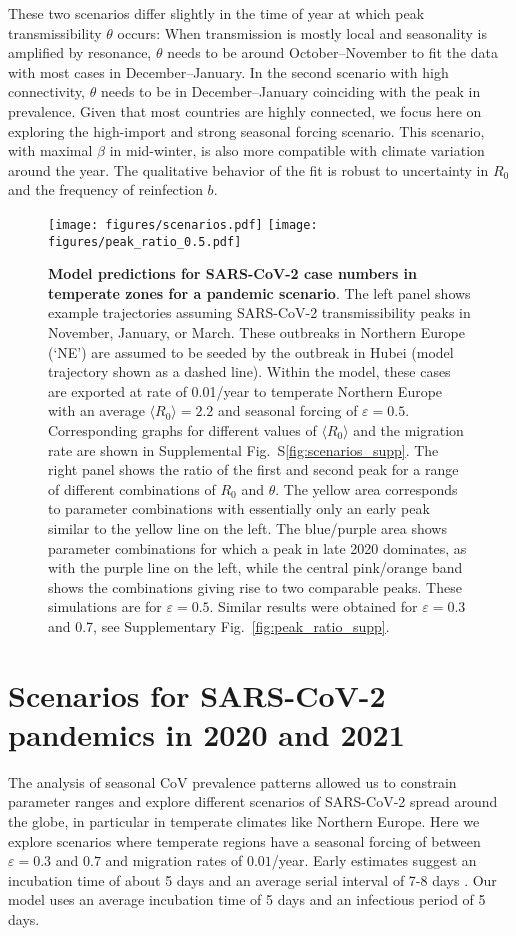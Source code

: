 \documentclass[rmp, reprint, superscriptaddress, floatfix,amsmath]{revtex4-1}
\newcommand{\forcing}{\varepsilon}
\begin{document}
These two scenarios differ slightly in the time of year at which peak transmissibility $\theta$ occurs: 
When transmission is mostly local and seasonality is amplified by resonance, $\theta$ needs to be around October--November to fit the data with most cases in December--January. 
In the second scenario with high connectivity, $\theta$ needs to be in December--January coinciding with the peak in prevalence.
Given that most countries are highly connected, we focus here on exploring the high-import and strong seasonal forcing scenario.
This scenario, with maximal $\beta$ in mid-winter, is also more compatible with climate variation around the year.
The qualitative behavior of the fit is robust to uncertainty in $R_0$ and the frequency of reinfection $b$.


\begin{figure*}
    \centering
    \texttt{[image: figures/scenarios.pdf]}
    \texttt{[image: figures/peak\_ratio\_0.5.pdf]}
\caption{{\bf Model predictions for SARS-CoV-2 case numbers in temperate zones for a pandemic scenario}. The left panel shows example trajectories assuming SARS-CoV-2 transmissibility peaks in November, January, or March. 
These outbreaks in Northern Europe (`NE') are assumed to be seeded by the outbreak in Hubei (model trajectory shown as a dashed line).
Within the model, these cases are exported at rate of 0.01/year to temperate Northern Europe with an average $\langle R_0\rangle = 2.2$ and seasonal forcing of $\forcing=0.5$. Corresponding graphs for different values of $\langle R_0\rangle$ and the migration rate are shown in Supplemental Fig.~S\ref{fig:scenarios_supp}.
The right panel shows the ratio of the first and second peak for a range of different combinations of $R_0$ and $\theta$. 
The yellow area corresponds to parameter combinations with essentially only an early peak similar to the yellow line on the left. 
The blue/purple area shows parameter combinations for which a peak in late 2020 dominates, as with the purple line on the left, while the central pink/orange band shows the combinations giving rise to two comparable peaks. 
These simulations are for $\forcing=0.5$. Similar results were obtained for $\forcing=0.3$ and 0.7, see Supplementary  Fig.~\ref{fig:peak_ratio_supp}.}
    \label{fig:nCov_predictions}
\end{figure*}

\section{Scenarios for SARS-CoV-2 pandemics in 2020 and 2021}
\label{section:sars_pandemic_regional}
The analysis of seasonal CoV prevalence patterns allowed us to constrain parameter ranges and explore different scenarios of SARS-CoV-2 spread around the globe, in particular in temperate climates like Northern Europe. 
Here we explore scenarios where temperate regions have a seasonal forcing of between $\forcing=0.3$ and $0.7$ and migration rates of $0.01$/year. 
Early estimates suggest an incubation time of about 5 days and an average serial interval of 7-8 days \citep{wu_nowcasting_2020}.
Our model uses an average incubation time of 5 days \citep{backer_incubation_2020} and an infectious period of 5 days.
\end{document}
